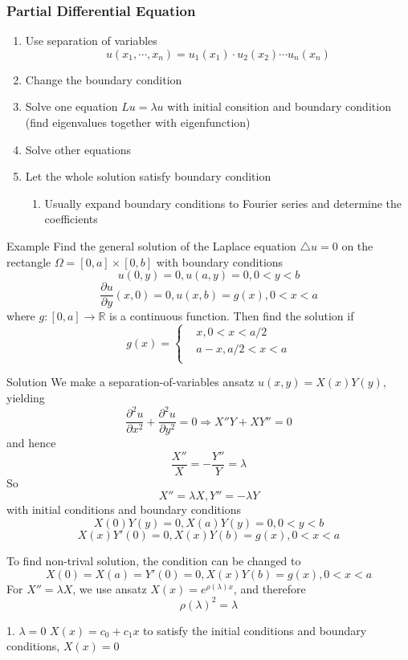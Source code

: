 \documentclass{beamer}
\begin{document}
\begin{frame}
\frametitle{Partial Differential Equation}
\begin{enumerate}
\item Use separation of variables
$$u(x_1,\cdots, x_n) = u_1(x_1) \cdot u_2(x_2) \cdots u_n(x_n)$$
\item Change the boundary condition
\item Solve one equation $L u=\lambda u$ with initial consition and boundary condition (find eigenvalues together with eigenfunction)
\item Solve other equations
\item Let the whole solution satisfy boundary condition 
\begin{enumerate}
\item Usually expand boundary conditions to Fourier series and determine the coefficients
\end{enumerate}
\end{enumerate}

\end{frame}
\begin{frame}
\begin{block}{Example}
Find the general solution of the Laplace equation $\triangle u = 0$ on the rectangle $\Omega = [0,a] \times [0,b]$ with boundary conditions
$$u(0, y) = 0, u(a,y) = 0, 0 < y < b$$
$$\dfrac{\partial u}{\partial y}(x,0) = 0, u(x, b) = g(x), 0 < x < a$$
where $g : [0, a] \rightarrow \mathbb{R}$ is a continuous function. Then find the solution if
$$g(x) =\left\{
\begin{aligned}
&x,0<x<a/2\\
&a-x,a/2<x<a\\
\end{aligned}
\right.
$$
\end{block}
\end{frame}
\begin{frame}
\begin{block}{Solution}
We make a separation-of-variables ansatz $u(x, y) = X(x)Y (y)$, yielding
$$\dfrac{\partial^2 u}{\partial x^2}+\dfrac{\partial^2 u}{\partial y^2}=0\Rightarrow X''Y+XY''=0$$
and hence
$$\dfrac{X''}{X}=-\dfrac{Y''}{Y}=\lambda$$
So
$$X''=\lambda X, Y''=-\lambda Y $$
with initial conditions and boundary conditions
$$X(0)Y(y)=0,X(a)Y(y)=0, 0<y<b$$
$$X(x)Y'(0)=0,X(x)Y(b)=g(x),0<x<a$$
\end{block}
\end{frame}
\begin{frame}
To find non-trival solution, the condition can be changed to
$$X(0)=X(a)=Y'(0)=0,X(x)Y(b)=g(x),0<x<a$$
For $X''=\lambda X$, we use ansatz $X(x)=e^{\rho(\lambda)x}$, and therefore
$$\rho(\lambda)^2=\lambda$$
\begin{block}{1. $\lambda=0$}
$X(x)=c_0+c_1x$ to satisfy the initial conditions and boundary conditions, $X(x)=0$
\end{block}
\end{frame}
\end{document}

